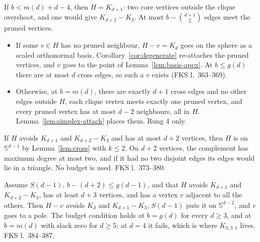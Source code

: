 \begin{lemma}
  \label{lem:branch-B}
  \leanok
  If $b < m(d) + d - 4$, then $H = K_{d+1}$: two core vertices outside the clique overshoot,
  and one would give $K_{d+2} - K_3$. At most $b - \binom{d+1}{2}$ edges meet the pruned
  vertices.
  \begin{itemize}
    \item If some $v \in H$ has no pruned neighbour, $H - v = K_d$ goes on the sphere as a
      scaled orthonormal basis, Corollary~\ref{cor:degenerate} re-attaches the pruned
      vertices, and $v$ goes to the point of Lemma~\ref{lem:basis-apex}. At $b \le g(d)$
      there are at most $d$ cross edges, so such a $v$ exists (FKS l.~363--369).
    \item Otherwise, at $b = m(d)$, there are exactly $d + 1$ cross edges and no other edges
      outside $H$, each clique vertex meets exactly one pruned vertex, and every pruned
      vertex has at most $d - 2$ neighbours, all in $H$. Lemma~\ref{lem:simplex-attach}
      places them. Rung 4 only.
  \end{itemize}
\end{lemma}

\begin{lemma}
  \label{lem:branch-C-small}
  \leanok
  If $H$ avoids $K_{d+1}$ and $K_{d+2} - K_3$ and has at most $d + 2$ vertices, then $H$ is
  on $\mathbb{S}^{d-1}$ by Lemma~\ref{lem:cross} with $k \le 2$. On $d + 2$ vertices, the
  complement has maximum degree at most two, and if it had no two disjoint edges its edges
  would lie in a triangle. No budget is used. FKS l.~373--380.
\end{lemma}

\begin{lemma}
  \label{lem:branch-C-universal}
  \leanok
  Assume $S(d-1)$, $b - (d + 2) \le g(d-1)$, and that $H$ avoids $K_{d+1}$ and
  $K_{d+2} - K_3$, has at least $d + 3$ vertices, and has a vertex $v$ adjacent to all the
  others. Then $H - v$ avoids $K_d$ and $K_{d+1} - K_3$, $S(d-1)$ puts it on
  $\mathbb{S}^{d-2}$, and $v$ goes to a pole. The budget condition holds at $b = g(d)$ for
  every $d \ge 3$, and at $b = m(d)$ with slack zero for $d \ge 5$; at $d = 4$ it fails,
  which is where $K_{3,3,1}$ lives. FKS l.~384--387.
\end{lemma}

